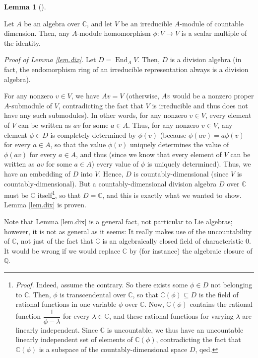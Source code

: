 \documentclass
[numbers=enddot,12pt,final,onecolumn,german,notitlepage]{scrartcl}%
\theoremstyle{definition}
\newtheorem{lem}[theo]{Lemma}
\newenvironment{lemma}[1][]
{\begin{lem}[#1]\begin{leftbar}}
{\end{leftbar}\end{lem}}
\begin{document}
\begin{lemma}
[Dixmier's Lemma]\label{lem.dix}Let $A$ be an algebra over $\mathbb{C}$, and
let $V$ be an irreducible $A$-module of countable dimension. Then, any
$A$-module homomorphism $\phi:V\rightarrow V$ is a scalar multiple of the identity.
\end{lemma}

\textit{Proof of Lemma \ref{lem.dix}.} Let $D=\operatorname*{End}%
\nolimits_{A}V$. Then, $D$ is a division algebra (in fact, the endomorphism
ring of an irreducible representation always is a division algebra).

For any nonzero $v\in V$, we have $Av=V$ (otherwise, $Av$ would be a nonzero
proper $A$-submodule of $V$, contradicting the fact that $V$ is irreducible
and thus does not have any such submodules). In other words, for any nonzero
$v\in V$, every element of $V$ can be written as $av$ for some $a\in A$. Thus,
for any nonzero $v\in V$, any element $\phi\in D$ is completely determined by
$\phi\left(  v\right)  $ (because $\phi\left(  av\right)  =a\phi\left(
v\right)  $ for every $a\in A$, so that the value $\phi\left(  v\right)  $
uniquely determines the value of $\phi\left(  av\right)  $ for every $a\in A$,
and thus (since we know that every element of $V$ can be written as $av$ for
some $a\in A$) every value of $\phi$ is uniquely determined). Thus, we have an
embedding of $D$ into $V$. Hence, $D$ is countably-dimensional (since $V$ is
countably-dimensional). But a countably-dimensional division algebra $D$ over
$\mathbb{C}$ must be $\mathbb{C}$ itself\footnote{\textit{Proof.} Indeed,
assume the contrary. So there exists some $\phi\in D$ not belonging to
$\mathbb{C}$. Then, $\phi$ is transcendental over $\mathbb{C}$, so that
$\mathbb{C}\left(  \phi\right)  \subseteq D$ is the field of rational
functions in one variable $\phi$ over $\mathbb{C}$. Now, $\mathbb{C}\left(
\phi\right)  $ contains the rational function $\dfrac{1}{\phi-\lambda}$ for
every $\lambda\in\mathbb{C}$, and these rational functions for varying
$\lambda$ are linearly independent. Since $\mathbb{C}$ is uncountable, we thus
have an uncountable linearly independent set of elements of $\mathbb{C}\left(
\phi\right)  $, contradicting the fact that $\mathbb{C}\left(  \phi\right)  $
is a subspace of the countably-dimensional space $D$, qed.}, so that
$D=\mathbb{C}$, and this is exactly what we wanted to show. Lemma
\ref{lem.dix} is proven.

Note that Lemma \ref{lem.dix} is a general fact, not particular to Lie
algebras; however, it is not as general as it seems: It really makes use of
the uncountability of $\mathbb{C}$, not just of the fact that $\mathbb{C}$ is
an algebraically closed field of characteristic $0$. It would be wrong if we
would replace $\mathbb{C}$ by (for instance) the algebraic closure of
$\mathbb{Q}$.
\end{document}
